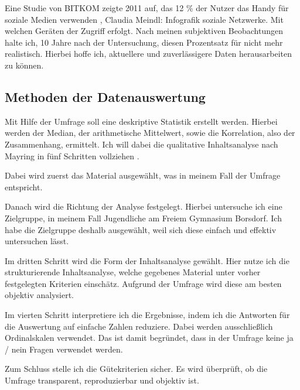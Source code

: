 Eine Studie von BITKOM zeigte 2011 auf, das 12 \% der Nutzer das Handy für soziale Medien verwenden \footnotemark\footnotetext
{\Cite{Meindl20.Febuar.2012}, Claudia Meindl: Infografik soziale Netzwerke. Mit welchen Geräten der Zugriff erfolgt}. Nach meinen 
subjektiven Beobachtungen halte ich, 10 Jahre nach der Untersuchung, diesen Prozentsatz für nicht mehr realistisch. Hierbei
hoffe ich, aktuellere und zuverlässigere Daten herausarbeiten zu können.

\subsection{Methoden der Datenauswertung}

Mit Hilfe der Umfrage soll eine deskriptive Statistik \footnotemark{} erstellt werden. Hierbei werden der Median, der arithmetische Mittelwert,
sowie die Korrelation, also der Zusammenhang, ermittelt. Ich will dabei die qualitative Inhaltsanalyse nach Mayring in fünf Schritten 
vollziehen \footnotemark{}. 

Dabei wird zuerst das Material ausgewählt, was in meinem Fall der Umfrage entspricht. 

Danach wird die Richtung der Analyse festgelegt. Hierbei untersuche ich eine Zielgruppe, in meinem Fall Jugendliche am Freiem Gymnasium 
Borsdorf. Ich habe die Zielgruppe deshalb ausgewählt, weil sich diese einfach und effektiv untersuchen lässt.

Im dritten Schritt wird die Form der Inhaltsanalyse gewählt. Hier nutze ich die strukturierende Inhaltsanalyse, welche 
gegebenes Material unter vorher festgelegten Kriterien einschätz. Aufgrund der Umfrage wird diese am besten objektiv 
analysiert.

Im vierten Schritt interpretiere ich die Ergebnisse, indem ich die Antworten für die Auswertung auf einfache Zahlen
reduziere. Dabei werden ausschließlich Ordinalskalen \footnotemark{} verwendet. Das ist damit begründet, dass in der 
Umfrage keine ja / nein Fragen verwendet werden.

Zum Schluss stelle ich die Gütekriterien sicher. Es wird überprüft, ob die Umfrage
transparent, reproduzierbar und objektiv ist.